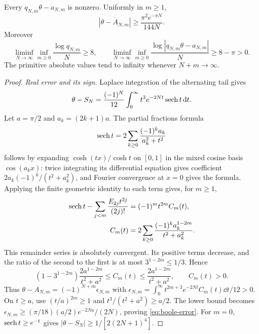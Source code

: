\begin{theorem}\label{thm:boole}
Every $q_{N,m}\theta-a_{N,m}$ is nonzero. Uniformly in $m\geq1$,
\begin{equation}\label{eq:boole-error}
 |\theta-A_{N,m}|\geq\frac{\pi^2e^{-\pi N}}{144N}.
\end{equation}
Moreover
\[
 \liminf_{N\to\infty}\inf_{m\geq0}\frac{\log q_{N,m}}N\geq8,
 \qquad
 \liminf_{N\to\infty}\inf_{m\geq0}
 \frac{\log|q_{N,m}\theta-a_{N,m}|}N\geq8-\pi>0.
\]
The primitive absolute values tend to infinity whenever $N+m\to\infty$.
\end{theorem}
\begin{proof}
\emph{Real error and its sign.}
Laplace integration of the alternating tail gives
\begin{equation}\label{eq:boole-tail}
 \theta-S_N=\frac{(-1)^N}{12}
       \int_0^\infty t^3e^{-2Nt}\operatorname{sech} t\,\mathrm d t.
\end{equation}
Let $a=\pi/2$ and $a_k=(2k+1)a$. The partial fractions formula
\[
 \operatorname{sech} t=2\sum_{k\geq0}\frac{(-1)^k a_k}{a_k^2+t^2}
\]
follows by expanding $\cosh(tx)/\cosh t$ on $[0,1]$ in the mixed
cosine basis $\cos(a_kx)$: twice integrating its differential equation
gives coefficient $2a_k(-1)^k/(t^2+a_k^2)$, and Fourier convergence
at $x=0$ gives the formula.
Applying the finite geometric identity to each term gives, for $m\geq1$,
\begin{align}
 \operatorname{sech} t-\sum_{j<m}\frac{E_{2j}t^{2j}}{(2j)!}
   &=(-1)^m t^{2m}C_m(t),\notag\\
 C_m(t)&=2\sum_{k\geq0}
               \frac{(-1)^k a_k^{1-2m}}{t^2+a_k^2}.\label{eq:boole-rem}
\end{align}
This remainder series is absolutely convergent. Its positive terms
decrease, and the ratio of the second to the first is at most
$3^{1-2m}\leq1/3$. Hence
\begin{equation}\label{eq:boole-sandwich}
 (1-3^{1-2m})\frac{2a^{1-2m}}{t^2+a^2}
 \leq C_m(t)\leq\frac{2a^{1-2m}}{t^2+a^2},\qquad C_m(t)>0.
\end{equation}
Thus $\theta-A_{N,m}=(-1)^{N+m}\epsilon_{N,m}$ with
$\epsilon_{N,m}=\int_0^\infty t^{2m+3}e^{-2Nt}C_m(t)\dd t/12>0$.
On $t\geq a$, use $(t/a)^{2m}\geq1$ and
$t^3/(t^2+a^2)\geq a/2$. The lower bound becomes
$\epsilon_{N,m}\geq(\pi/18)(a/2)e^{-2Na}/(2N)$, proving
\eqref{eq:boole-error}. For $m=0$, $\operatorname{sech} t\geq e^{-t}$ gives
$|\theta-S_N|\geq1/[2(2N+1)^4]$.


\end{proof}
